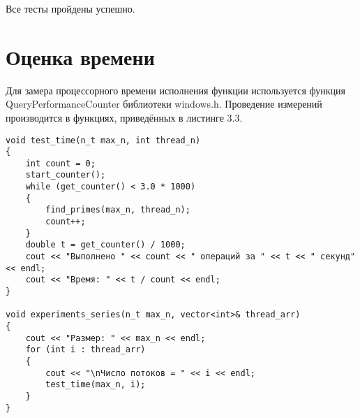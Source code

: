 Все тесты пройдены успешно.

\section{Оценка времени}
Для замера процессорного времени исполнения функции используется функция QueryPerformanceCounter библиотеки windows.h\cite{QueryPerformanceCounter}. Проведение измерений производится в функциях, приведённых в листинге 3.3.

\begin{lstlisting}[caption = Функции замера процессорного времени работы функции]
void test_time(n_t max_n, int thread_n)
{
	int count = 0;
	start_counter();
	while (get_counter() < 3.0 * 1000)
	{
		find_primes(max_n, thread_n);
		count++;
	}
	double t = get_counter() / 1000;
	cout << "Выполнено " << count << " операций за " << t << " секунд" << endl;
	cout << "Время: " << t / count << endl;
}

void experiments_series(n_t max_n, vector<int>& thread_arr)
{
	cout << "Размер: " << max_n << endl;
	for (int i : thread_arr)
	{
		cout << "\nЧисло потоков = " << i << endl;
		test_time(max_n, i);
	}
}
\end{lstlisting}

